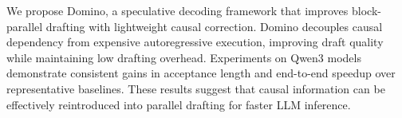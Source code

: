 We propose Domino, a speculative decoding framework that improves block-parallel drafting with lightweight causal correction. Domino decouples causal dependency from expensive autoregressive execution, improving draft quality while maintaining low drafting overhead. Experiments on Qwen3 models demonstrate consistent gains in acceptance length and end-to-end speedup over representative baselines. These results suggest that causal information can be effectively reintroduced into parallel drafting for faster LLM inference.
